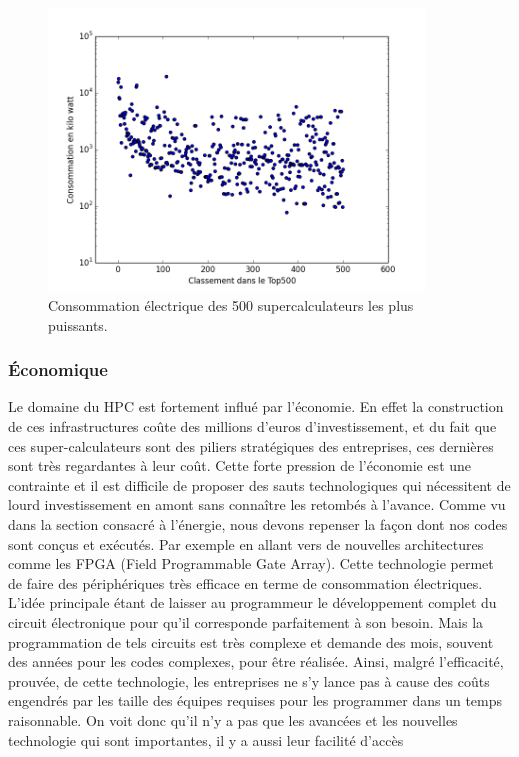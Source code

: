 \begin{figure}
    \center
    \includegraphics[width=10cm]{images/Chapitre1/pic_top500_power.png}
    \caption{\label{pic_top500_power} Consommation électrique des 500 supercalculateurs les plus puissants.}
\end{figure}



\subsubsection{Économique}
Le domaine du HPC est fortement influé par l'économie. En effet la construction de ces infrastructures coûte des millions d'euros d'investissement, et du fait que ces super-calculateurs sont des piliers stratégiques des entreprises, ces dernières sont très regardantes à leur coût. Cette forte pression de l'économie est une contrainte et il est difficile de proposer des sauts technologiques qui nécessitent de lourd investissement en amont sans connaître les retombés à l'avance. Comme vu dans la section consacré à l'énergie, nous devons repenser la façon dont nos codes sont conçus et exécutés. Par exemple en allant vers de nouvelles architectures comme les FPGA (Field Programmable Gate Array). Cette technologie permet de faire des périphériques très efficace en terme de consommation électriques. L'idée principale étant de laisser au programmeur le développement complet du circuit électronique pour qu'il corresponde parfaitement à son besoin. Mais la programmation de tels circuits est très complexe et demande des mois, souvent des années pour les codes complexes, pour être réalisée. Ainsi, malgré l'efficacité, prouvée, de cette technologie, les entreprises ne s'y lance pas à cause des coûts engendrés par les taille des équipes requises pour les programmer dans un temps raisonnable. On voit donc qu'il n'y a pas que les avancées et les nouvelles technologie qui sont importantes, il y a aussi leur facilité d'accès

